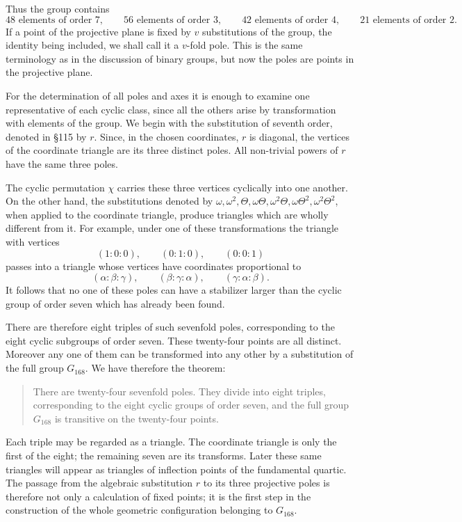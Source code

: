 \documentclass[12pt,a4paper]{article}
\begin{document}
Thus the group contains
\[
48\text{ elements of order }7,
\qquad 56\text{ elements of order }3,
\qquad 42\text{ elements of order }4,
\qquad 21\text{ elements of order }2.
\]
If a point of the projective plane is fixed by \(v\) substitutions of the group, the identity being included, we shall call it a \(v\)-fold pole.  This is the same terminology as in the discussion of binary groups, but now the poles are points in the projective plane.

For the determination of all poles and axes it is enough to examine one representative of each cyclic class, since all the others arise by transformation with elements of the group.  We begin with the substitution of seventh order, denoted in \S 115 by \(r\).  Since, in the chosen coordinates, \(r\) is diagonal, the vertices of the coordinate triangle are its three distinct poles.  All non-trivial powers of \(r\) have the same three poles.

The cyclic permutation \(\chi\) carries these three vertices cyclically into one another.  On the other hand, the substitutions denoted by \(\omega,\omega^2,\Theta,\omega\Theta,\omega^2\Theta,\omega\Theta^2,\omega^2\Theta^2\), when applied to the coordinate triangle, produce triangles which are wholly different from it.  For example, under one of these transformations the triangle with vertices
\[
(1:0:0),\qquad (0:1:0),\qquad (0:0:1)
\]
passes into a triangle whose vertices have coordinates proportional to
\[
(\alpha:\beta:\gamma),\qquad (\beta:\gamma:\alpha),\qquad
(\gamma:\alpha:\beta).
\]
It follows that no one of these poles can have a stabilizer larger than the cyclic group of order seven which has already been found.

There are therefore eight triples of such sevenfold poles, corresponding to the eight cyclic subgroups of order seven.  These twenty-four points are all distinct.  Moreover any one of them can be transformed into any other by a substitution of the full group \(G_{168}\).  We have therefore the theorem:

\begin{quote}
There are twenty-four sevenfold poles.  They divide into eight triples, corresponding to the eight cyclic groups of order seven, and the full group \(G_{168}\) is transitive on the twenty-four points.
\end{quote}

Each triple may be regarded as a triangle.  The coordinate triangle is only the first of the eight; the remaining seven are its transforms.  Later these same triangles will appear as triangles of inflection points of the fundamental quartic.  The passage from the algebraic substitution \(r\) to its three projective poles is therefore not only a calculation of fixed points; it is the first step in the construction of the whole geometric configuration belonging to \(G_{168}\).
\end{document}
